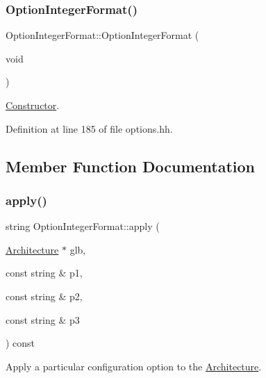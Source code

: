 \subsubsection{\texorpdfstring{OptionIntegerFormat()}{OptionIntegerFormat()}}
{\footnotesize\ttfamily Option\+Integer\+Format\+::\+Option\+Integer\+Format (\begin{DoxyParamCaption}\item[{void}]{ }\end{DoxyParamCaption})\hspace{0.3cm}{\ttfamily [inline]}}



\mbox{\hyperlink{class_constructor}{Constructor}}. 



Definition at line 185 of file options.\+hh.



\subsection{Member Function Documentation}
\mbox{\label{class_option_integer_format_a96f055544f7ea5a765906481a0880b4f}} 
\subsubsection{\texorpdfstring{apply()}{apply()}}
{\footnotesize\ttfamily string Option\+Integer\+Format\+::apply (\begin{DoxyParamCaption}\item[{\mbox{\hyperlink{class_architecture}{Architecture}} $\ast$}]{glb,  }\item[{const string \&}]{p1,  }\item[{const string \&}]{p2,  }\item[{const string \&}]{p3 }\end{DoxyParamCaption}) const\hspace{0.3cm}{\ttfamily [virtual]}}



Apply a particular configuration option to the \mbox{\hyperlink{class_architecture}{Architecture}}. 

